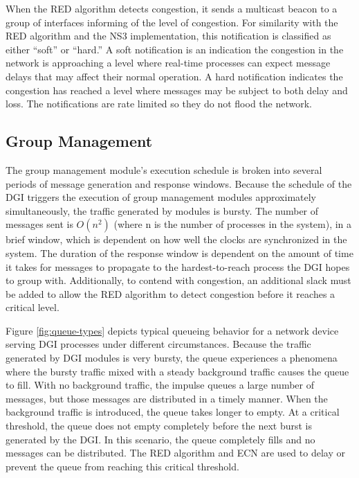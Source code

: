 When the \ac{RED} algorithm detects congestion, it sends a multicast beacon to a group of interfaces informing of the level of congestion.
For similarity with the \ac{RED} algorithm and the \ac{NS3} implementation, this notification is classified as either ``soft'' or ``hard.''
A soft notification is an indication the congestion in the network is approaching a level where real-time processes can expect message delays that may affect their normal operation.
A hard notification indicates the congestion has reached a level where messages may be subject to both delay and loss.
The notifications are rate limited so they do not flood the network.

\subsection{Group Management}

The group management module's execution schedule is broken into several periods of message generation and response windows.
Because the schedule of the \ac{DGI} triggers the execution of group management modules approximately simultaneously, the traffic generated by modules is bursty.
The number of messages sent is $O(n^2)$ (where n is the number of processes in the system), in a brief window, which is dependent on how well the clocks are synchronized in the system.
The duration of the response window is dependent on the amount of time it takes for messages to propagate to the hardest-to-reach process the \ac{DGI} hopes to group with.
Additionally, to contend with congestion, an additional slack must be added to allow the \ac{RED} algorithm to detect congestion before it reaches a critical level.

Figure \ref{fig:queue-types} depicts typical queueing behavior for a network device serving \ac{DGI} processes under different circumstances.
Because the traffic generated by \ac{DGI} modules is very bursty, the queue experiences a phenomena where the bursty traffic mixed with a steady background traffic causes the queue to fill.
With no background traffic, the impulse queues a large number of messages, but those messages are distributed in a timely manner.
When the background traffic is introduced, the queue takes longer to empty.
At a critical threshold, the queue does not empty completely before the next burst is generated by the \ac{DGI}.
In this scenario, the queue completely fills and no messages can be distributed.
The \ac{RED} algorithm and \ac{ECN} are used to delay or prevent the queue from reaching this critical threshold.

